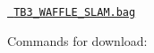 
\begin{DoxyItemize}
\item \href{https://github.com/ROBOTIS-GIT/bags}{\texttt{ T\+B3\+\_\+\+W\+A\+F\+F\+L\+E\+\_\+\+S\+L\+A\+M.\+bag}}
\item Commands for download\+: 
\begin{DoxyCode}{0}
\end{DoxyCode}
 
\end{DoxyItemize}